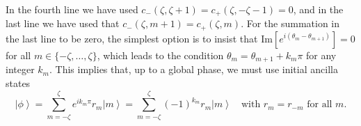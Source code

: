 \documentclass[epjST,numbook]{svjour}
\newcommand{\ket}[1]{\left \vert #1 \right >}
\newcommand{\impart}[1]{\text{Im}\left[ #1 \right]}
\begin{document}
{\begin{equation}
\end{equation}
In the fourth line we have used $c_-(\zeta,\zeta+1)=c_+(\zeta,-\zeta-1)=0$, and in the last line we have used that $c_-(\zeta,m+1)=c_+(\zeta,m)$. For the summation in the last line to be zero, the simplest option is to insist that $\impart{e^{i(\theta_{m}-\theta_{m+1})}}=0$ for all $m\in\{-\zeta,\ldots,\zeta\}$, which leads to the condition $\theta_{m}=\theta_{m+1}+k_m\pi$ for any integer $k_m$. This implies that, up to a global phase, we must use initial ancilla states
\begin{equation}
	\ket{\phi} = \sum_{m=-\zeta}^\zeta e^{ik_m\pi}r_m \ket{m}=\sum_{m=-\zeta}^\zeta (-1)^{k_m}r_m \ket{m} \quad\text{with $r_m=r_{-m}$ for all $m$}.
\end{equation}
}



%
\end{document}
